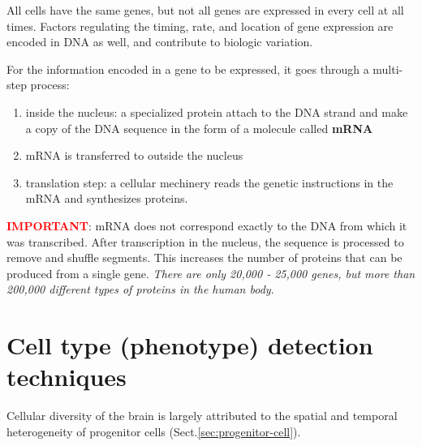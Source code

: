 All cells have the same genes, but not all genes are expressed in every cell at
all times. Factors regulating the timing, rate, and location of gene expression
are encoded in DNA as well, and contribute to biologic variation.

For the  information encoded in a gene to be expressed, it goes through a
multi-step
 process:
\begin{enumerate}
  \item inside the nucleus: a specialized protein attach to the DNA strand and
  make a copy of the DNA sequence in the form of a molecule called {\bf mRNA}
  
  \item mRNA is transferred to outside the nucleus
  
  \item translation step: a cellular mechinery reads the genetic instructions in
  the mRNA and synthesizes proteins.
\end{enumerate}

\textcolor{red}{\bf IMPORTANT}: mRNA does not correspond exactly to the DNA from
which it was transcribed. After transcription in the nucleus, the sequence is
processed to remove and shuffle segments. This increases the number of proteins
that can be produced from a single gene.
{\it There are only 20,000 - 25,000 genes, but more than 200,000 different types
of proteins in the human body}.

\section{Cell type (phenotype) detection techniques}

Cellular diversity of the brain is largely attributed to the spatial and
temporal heterogeneity of progenitor cells (Sect.\ref{sec:progenitor-cell}).
 
